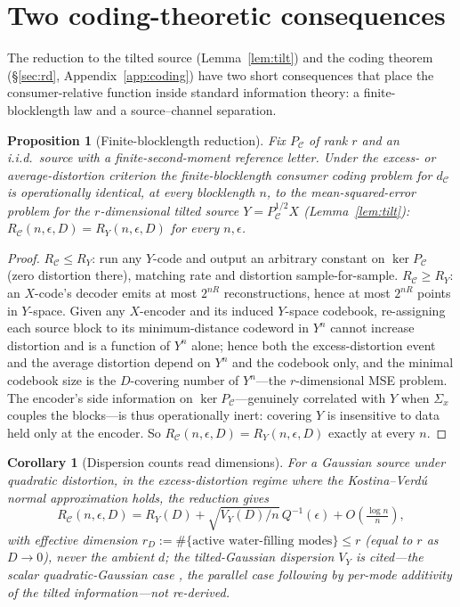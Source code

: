 \documentclass[lettersize,onecolumn]{IEEEtran}
\newtheorem{proposition}{Proposition}
\newtheorem{corollary}{Corollary}
\theoremstyle{definition}
\theoremstyle{remark}
\newcommand{\PC}{P_{\mathcal{C}}}
\begin{document}
\section{Two coding-theoretic consequences}\label{sec:consequences}

The reduction to the tilted source (Lemma~\ref{lem:tilt}) and the coding theorem
(\S\ref{sec:rd}, Appendix~\ref{app:coding}) have two short consequences that place the
consumer-relative function inside standard information theory: a finite-blocklength law
and a source--channel separation.

\begin{proposition}[Finite-blocklength reduction]\label{prop:dispersion}
Fix $\PC$ of rank $r$ and an i.i.d.\ source with a finite-second-moment reference letter.
Under the excess- or average-distortion criterion the finite-blocklength consumer coding
problem for $d_{\mathcal C}$ is operationally identical, \emph{at every blocklength $n$}, to
the mean-squared-error problem for the $r$-dimensional tilted source $Y=\PC^{1/2}X$
(Lemma~\ref{lem:tilt}): $R_{\mathcal C}(n,\epsilon,D)=R_Y(n,\epsilon,D)$ for every
$n,\epsilon$.
\end{proposition}
\begin{proof}
$R_{\mathcal C}\le R_Y$: run any $Y$-code and output an arbitrary constant on $\ker\PC$
(zero distortion there), matching rate and distortion sample-for-sample. $R_{\mathcal
C}\ge R_Y$: an $X$-code's decoder emits at most $2^{nR}$ reconstructions, hence at most
$2^{nR}$ points in $Y$-space. Given any $X$-encoder and its induced $Y$-space codebook,
re-assigning each source block to its minimum-distance codeword in $Y^n$ cannot increase
distortion and is a function of $Y^n$ alone; hence both the excess-distortion event and the
average distortion depend on $Y^n$ and the codebook only, and the minimal codebook size is
the $D$-covering number of $Y^n$---the $r$-dimensional MSE problem. The encoder's side
information on $\ker\PC$---genuinely correlated with $Y$ when $\Sigma_x$ couples the
blocks---is thus operationally inert: covering $Y$ is insensitive to data held only at the
encoder. So $R_{\mathcal C}(n,\epsilon,D)=R_Y(n,\epsilon,D)$ exactly at every $n$.
\end{proof}

\begin{corollary}[Dispersion counts read dimensions]\label{cor:dispersion}
For a Gaussian source under quadratic distortion, in the excess-distortion regime where the
Kostina--Verd\'u \cite{kostinaverdu2012} normal approximation holds, the reduction gives
\[
R_{\mathcal C}(n,\epsilon,D)=R_Y(D)+\sqrt{V_Y(D)/n}\,Q^{-1}(\epsilon)+O\!\left(\tfrac{\log n}{n}\right),
\]
with effective dimension $r_D:=\#\{\text{active water-filling modes}\}\le r$ (equal to $r$
as $D\to0$), never the ambient $d$; the tilted-Gaussian dispersion $V_Y$ is cited---the
scalar quadratic-Gaussian case \cite{kostinaverdu2012,ingberkochman}, the parallel case
following by per-mode additivity of the tilted information---not re-derived.
\end{corollary}
\end{document}

